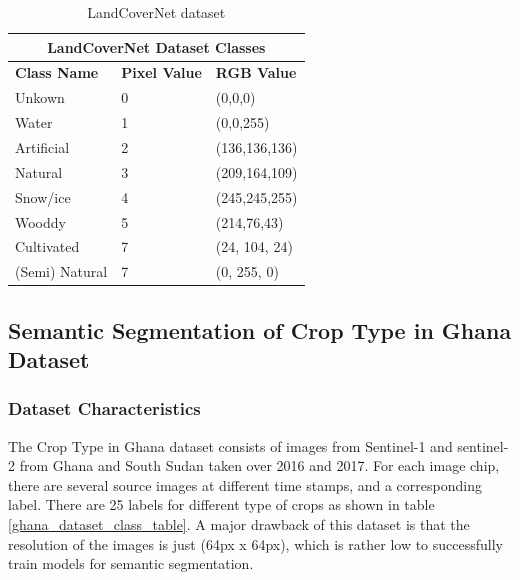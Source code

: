 \documentclass[conference]{IEEEtran}
\begin{document}
\begin{table}[htbp]
\centering
\caption{LandCoverNet dataset}
\begin{tabular}{|p{1.8cm}|p{0.6cm}|p{1.6cm}|}
 \hline
 \multicolumn{3}{|c|}{\textbf{LandCoverNet Dataset Classes}} \\
 \hline
 \textbf{Class Name} & \textbf{Pixel Value}& \textbf{RGB Value} \\
 \hline
 Unkown & 0  & (0,0,0)\\ 
 \hline
 Water & 1  & (0,0,255)\\ 
 \hline
 Artificial & 2  & (136,136,136)\\ 
 \hline
 Natural & 3  & (209,164,109)\\ 
 \hline
 Snow/ice & 4 &  (245,245,255)\\ 
 \hline
 Wooddy & 5  & (214,76,43)\\ 
 \hline
 Cultivated & 7  & (24, 104, 24)\\ 
 \hline
 (Semi) Natural & 7  & (0, 255, 0)\\ 
 \hline
\end{tabular}
\label{landcovernet_dataset}
\end{table}

\subsection{Semantic Segmentation of Crop Type in Ghana Dataset}
\subsubsection{Dataset Characteristics}
The Crop Type in Ghana dataset \cite{Rustowicz2019SemanticSO} consists of images from Sentinel-1 and sentinel-2 from Ghana and South Sudan taken over 2016 and 2017. For each image chip, there are several source images at different time stamps, and a corresponding label. There are 25 labels for different type of crops as shown in table \ref{ghana_dataset_class_table}. A major drawback of this dataset is that the resolution of the images is just (64px x 64px), which is rather low to successfully train models for semantic segmentation. 
\end{document}
